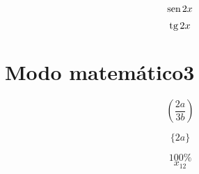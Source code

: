 \documentclass{article}
\renewcommand{\sin}{\mathrm{sen \hspace{0.5mm}}}
\renewcommand{\tan}{\mathrm{tg \hspace{0.5mm}}}
\begin{document}
    \begin{equation}
    	\sin{2x}
    \end{equation}
    
    \begin{equation}
    	\tan{2x}
    \end{equation}
    
     \section{Modo matemático3}
     
     \begin{equation*}
     	\left(\frac{2a}{3b}\right)
     \end{equation*}
     
     \begin{equation*}
     	\{2a\} 
     \end{equation*}
	
	\begin{equation*}
			100\%
	\end{equation*}
	\begin{equation*}
		x_{12}
	\end{equation*}
	
	
\end{document}
